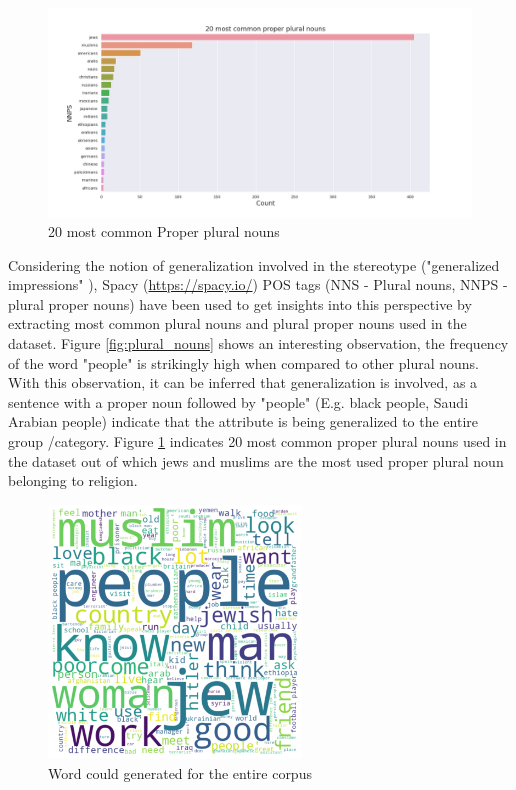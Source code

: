 \begin{figure}[h!]
    \centering
    \includegraphics[width=1\textwidth]{thesis/figures/20 most common proper plural nouns.png}
    \caption{20 most common Proper plural nouns}
    \label{fig:Proper_plural_nouns}
\end{figure}



Considering the notion of generalization involved in the stereotype ("generalized impressions" \cite{burgers2020language}), Spacy (\url{https://spacy.io/}) POS tags (NNS - Plural nouns, NNPS - plural proper nouns) have been used to get insights into this perspective by extracting most common plural nouns and plural proper nouns used in the dataset. Figure \ref{fig:plural_nouns} shows an interesting observation, the frequency of the word "people" is strikingly high when compared to other plural nouns. With this observation, it can be inferred that generalization is involved, as a sentence with a proper noun followed by "people" (E.g. black people, Saudi Arabian people) indicate that the attribute is being generalized to the entire group /category. Figure \ref{fig:Proper_plural_nouns} indicates 20 most common proper plural nouns used in the dataset out of which jews and muslims are the most used proper plural noun belonging to religion.

\pagebreak

\begin{figure}[h!]
    \centering
    \includegraphics[width=0.6\textwidth]{thesis/figures/Overall.png}
    \caption{Word could generated for the entire corpus}
    \label{fig:word clouds}
\end{figure}


